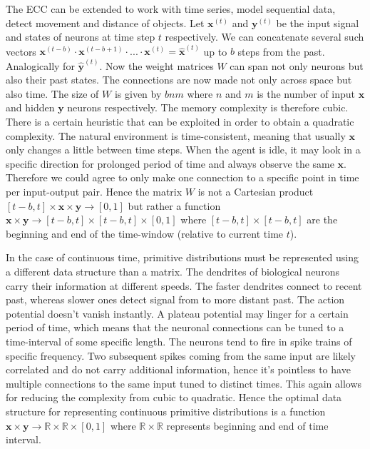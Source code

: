 \documentclass[12pt]{article}
\begin{document}
The ECC can be extended to work with time series, model sequential data, detect movement and distance of objects. Let $\boldsymbol{x}^{(t)}$ and $\boldsymbol{y}^{(t)}$ be the input signal and states of neurons at time step $t$ respectively. We can concatenate several such vectors $\boldsymbol{x}^{(t-b)}\cdot \boldsymbol{x}^{(t-b+1) }\cdot ...\cdot\boldsymbol{x}^{(t)}=\boldsymbol{\hat{x}}^{(t)}$ up to $b$ steps from the past. Analogically for $\boldsymbol{\hat{y}}^{(t)}$. Now the weight matrices $W$ can span not only neurons but also their past states. The connections are now made not only across space but also time. The size of $W$ is given by $bnm$ where $n$ and $m$ is the number of input $\boldsymbol{x}$ and hidden $\boldsymbol{y}$ neurons respectively. The memory complexity is therefore cubic. There is a certain heuristic that can be exploited in order to obtain a quadratic complexity. The natural environment is time-consistent, meaning that usually $\boldsymbol{x}$ only changes a little between time steps. When the agent is idle, it may look in a specific direction for prolonged period of time and always observe the same $\boldsymbol{x}$. Therefore we could agree to only make one connection to a specific point in time per input-output pair. Hence the matrix $W$ is not a Cartesian product $[t-b,t] \times \boldsymbol{x} \times \boldsymbol{y} \rightarrow [0,1]$  but rather a function $\boldsymbol{x} \times \boldsymbol{y} \rightarrow [t-b,t] \times [t-b,t] \times [0,1]$ where $[t-b,t] \times [t-b,t]$ are the beginning and end of the time-window (relative to current time $t$).

In the case of continuous time, primitive distributions must be represented using a different data structure than a matrix. The dendrites of biological neurons carry their information at different speeds. The faster dendrites connect to recent past, whereas slower ones detect signal from to more distant past. The action potential doesn't vanish instantly. A plateau potential may linger for a certain period of time, which means that the neuronal connections can be tuned to a time-interval of some specific length. The neurons tend to fire in spike trains of specific frequency. Two subsequent spikes coming from the same input are likely correlated and do not carry additional information, hence it's pointless to have multiple connections to the same input tuned to distinct times. This again allows for reducing the complexity from cubic to quadratic. Hence the optimal data structure for representing continuous primitive distributions is a function $\boldsymbol{x} \times \boldsymbol{y} \rightarrow \mathbb{R} \times \mathbb{R} \times [0,1]$ where $\mathbb{R} \times \mathbb{R}$ represents beginning and end of time interval.
\end{document}
